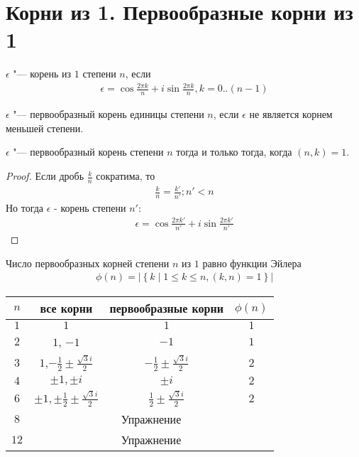 ﻿\section{Корни из 1. Первообразные корни из 1}

\begin{Def}
$\epsilon$ "--- корень из $1$ степени $n$, если
\begin{gather*}
\epsilon = \cos{\frac{2 \pi k}{n}} + i \sin{\frac{2 \pi k}{n}}, k = 0..(n - 1)
\end{gather*}
\end{Def}

\begin{Def}
$\epsilon$ "--- первообразный корень единицы степени $n$, если $\epsilon$ не является корнем меньшей степени.
\end{Def}

\begin{assertion}
$\epsilon$ "--- первообразный корень степени $n$ тогда и только тогда, когда $(n, k) = 1$.
\end{assertion}

\begin{proof}
Если дробь $\frac{k}{n}$ сократима, то 
\begin{gather*}
\frac{k}{n} = \frac{k'}{n'}; n' < n
\end{gather*}
Но тогда $\epsilon$ - корень степени $n'$: 
\begin{gather*}
\epsilon = \cos\frac{2\pi k'}{n'} + i \sin\frac{2\pi k'}{n'}
\end{gather*}
\end{proof}

\begin{conseq}
Число первообразных корней степени $n$ из $1$ равно функции Эйлера
\begin{gather*}
\phi(n) = \left|\left\{k \mid 1 \le k \le n, (k, n) = 1\right\}\right|
\end{gather*}
\end{conseq}

\begin{center}
\begin{tabular}{|c|c|c|c|}
\hline
$n$ & все корни & первообразные корни & $\phi(n)$ \\
\hline
$1$ & $1$ & $1$ & $1$ \\
\hline
$2$ & $1$, $-1$ & $-1$ & $1$ \\
\hline
$3$ & $1$,$-\frac{1}{2} \pm \frac{\sqrt{3}i}{2}$ & $-\frac{1}{2} \pm \frac{\sqrt{3}i}{2}$ & $2$ \\
\hline
$4$ & $\pm1,\pm i$ & $\pm i$ & $2$ \\
\hline
$6$ & $\pm1,\pm\frac{1}{2} \pm \frac{\sqrt{3}i}{2}$ & $\frac{1}{2} \pm \frac{\sqrt{3}i}{2}$ & $2$ \\
\hline
$8$ & \multicolumn{3}{c|}{Упражнение} \\
\hline
$12$ & \multicolumn{3}{c|}{Упражнение} \\
\hline
\end{tabular}
\end{center}

